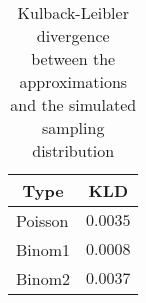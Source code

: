 \begin{table}[!tbp]
\caption{Kulback-Leibler divergence between the approximations and the simulated sampling distribution\label{tab:kld}} 
\begin{center}
\begin{tabular}{lr}
\hline\hline
\multicolumn{1}{c}{Type}&\multicolumn{1}{c}{KLD}\tabularnewline
\hline
Poisson&$0.0035$\tabularnewline
Binom1&$0.0008$\tabularnewline
Binom2&$0.0037$\tabularnewline
\hline
\end{tabular}\end{center}
\end{table}
